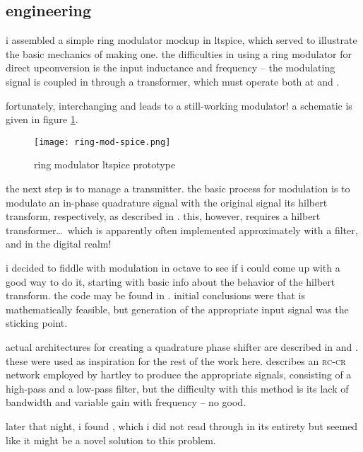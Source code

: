 \subsection*{engineering}
i assembled a simple ring modulator mockup in ltspice, which served to
illustrate the basic mechanics of making one. the difficulties in using a ring
modulator for direct upconversion is the input inductance and frequency -- the
modulating signal is coupled in through a transformer, which must operate both
at \rf and \ifreq.

fortunately, interchanging \rf and \ifreq leads to a still-working modulator! a
schematic is given in figure \ref{fig:ring-mod-spice}.

\begin{figure}[H]
	\centering
	\texttt{[image: ring-mod-spice.png]}
	\caption{ring modulator ltspice prototype}
	\label{fig:ring-mod-spice}
\end{figure}

the next step is to manage a \ssb transmitter. the basic process for \ssb
modulation is to modulate an in-phase \amp quadrature signal with the original
signal \amp its hilbert transform, respectively, as described in
\autocite{matlab-ssb}. this, however, requires a hilbert transformer\ldots\
which is apparently often implemented approximately with a filter, and in the
digital realm!

i decided to fiddle with \ssb modulation in octave to see if i could come up
with a good way to do it, starting with basic info about the behavior of the
hilbert transform. the code may be found in
. initial conclusions were that \ssb is
mathematically feasible, but generation of the appropriate input signal was the
sticking point.

actual architectures for creating a quadrature phase shifter are described in
\autocite{wideband-shifter} and \autocite{audio-shifter}. these were used as
inspiration for the rest of the work here. \autocite{wideband-shifter}
describes an \textsc{rc-cr} network employed by hartley to produce the
appropriate signals, consisting of a high-pass and a low-pass filter, but the
difficulty with this method is its lack of bandwidth and variable gain with
frequency -- no good.

later that night, i found \autocite{shade-shifter}, which i did not read
through in its entirety but seemed like it might be a novel solution to this
problem.
